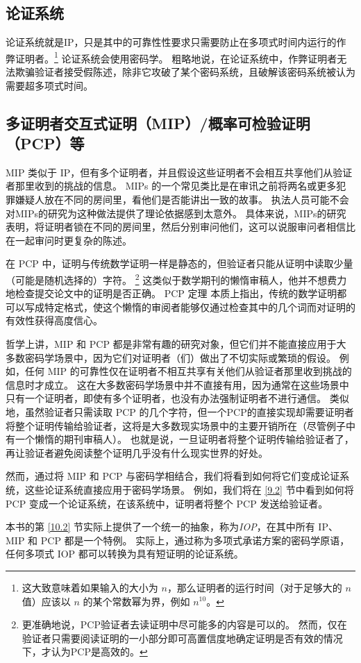 \subsection{论证系统}
论证系统就是IP，只是其中的可靠性性要求只需要防止在多项式时间内运行的作弊证明者。\footnote{这大致意味着如果输入的大小为 $n$，那么证明者的运行时间（对于足够大的 $n$ 值）应该以 $n$ 的某个常数幂为界，例如 $n^{10} $。}
论证系统会使用密码学。 
粗略地说，在论证系统中，作弊证明者无法欺骗验证者接受假陈述，除非它攻破了某个密码系统，且破解该密码系统被认为需要超多项式时间。

\subsection{多证明者交互式证明（MIP）/概率可检验证明（PCP）等}
MIP 类似于 IP，但有多个证明者，并且假设这些证明者不会相互共享他们从验证者那里收到的挑战的信息。 MIPs 的一个常见类比是在审讯之前将两名或更多犯罪嫌疑人放在不同的房间里，看他们是否能讲出一致的故事。 
执法人员可能不会对MIPs的研究为这种做法提供了理论依据感到太意外。
具体来说，MIPs的研究表明，将证明者锁在不同的房间里，然后分别审问他们，这可以说服审问者相信比在一起审问时更复杂的陈述。


在 PCP 中，证明与传统数学证明一样是静态的，但验证者只能从证明中读取少量（可能是随机选择的）字符。 \footnote{更准确地说，PCP验证者去读证明中尽可能多的内容是可以的。 然而，仅在验证者只需要阅读证明的一小部分即可高置信度地确定证明是否有效的情况下，才认为PCP是高效的。} 这类似于数学期刊的懒惰审稿人，他并不想费力地检查提交论文中的证明是否正确。 
PCP 定理 \cite{ALM+98,AS98}本质上指出，传统的数学证明都可以写成特定格式，使这个懒惰的审阅者能够仅通过检查其中的几个词而对证明的有效性获得高度信心。

哲学上讲，MIP 和 PCP 都是非常有趣的研究对象，但它们并不能直接应用于大多数密码学场景中，因为它们对证明者（们）做出了不切实际或繁琐的假设。 
例如，任何 MIP 的可靠性仅在证明者不相互共享有关他们从验证者那里收到挑战的信息时才成立。 这在大多数密码学场景中并不直接有用，因为通常在这些场景中只有一个证明者，即使有多个证明者，也没有办法强制证明者不进行通信。 
类似地，虽然验证者只需读取 PCP 的几个字符，但一个PCP的直接实现却需要证明者将整个证明传输给验证者，这将是大多数现实场景中的主要开销所在（尽管例子中有一个懒惰的期刊审稿人）。 也就是说，一旦证明者将整个证明传输给验证者了，再让验证者避免阅读整个证明几乎没有什么现实世界的好处。

然而，通过将 MIP 和 PCP 与密码学相结合，我们将看到如何将它们变成论证系统，这些论证系统直接应用于密码学场景。 例如，我们将在 \ref{9.2} 节中看到如何将 PCP 变成一个论证系统，在该系统中，证明者将整个 PCP 发送给验证者。

本书的第 \ref{10.2} 节实际上提供了一个统一的抽象，称为\emph{IOP}，在其中所有 IP、MIP 和 PCP 都是一个特例。 实际上，通过称为多项式承诺方案的密码学原语，任何多项式 IOP 都可以转换为具有短证明的论证系统。